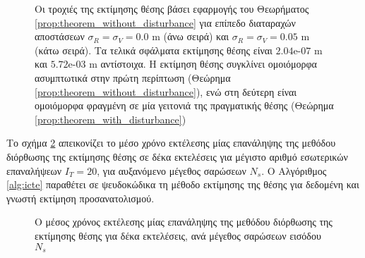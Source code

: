 \begin{figure}[!h]\centering\vspace{1cm}
  
\caption{\small Οι τροχιές της εκτίμησης θέσης βάσει εφαρμογής του Θεωρήματος
         \ref{prop:theorem_without_disturbance} για επίπεδο διαταραχών
         αποστάσεων $\sigma_R = \sigma_V = 0.0$ m (άνω σειρά) και
         $\sigma_R = \sigma_V = 0.05$ m (κάτω σειρά). Τα τελικά σφάλματα
         εκτίμησης θέσης είναι $2.04$e-$07$ m και $5.72$e-$03$ m αντίστοιχα.
         Η εκτίμηση θέσης συγκλίνει ομοιόμορφα ασυμπτωτικά στην πρώτη περίπτωση
         (Θεώρημα \ref{prop:theorem_without_disturbance}), ενώ στη δεύτερη
         είναι ομοιόμορφα φραγμένη σε μία γειτονιά της πραγματικής θέσης
         (Θεώρημα \ref{prop:theorem_with_disturbance})}
\label{fig:02_04_03:map_convergence}
\end{figure}

Το σχήμα \ref{fig:02_04_03:execution_times} απεικονίζει το μέσο χρόνο εκτέλεσης
μίας επανάληψης της μεθόδου διόρθωσης της εκτίμησης θέσης σε δέκα εκτελέσεις
για μέγιστο αριθμό εσωτερικών επαναλήψεων $I_T = 20$, για αυξανόμενο μέγεθος
σαρώσεων $N_s$. Ο Αλγόριθμος \ref{alg:icte} παραθέτει σε ψευδοκώδικα τη μέθοδο
εκτίμησης της θέσης για δεδομένη και γνωστή εκτίμηση προσανατολισμού.

\begin{figure}[!h]\centering
  
\caption{\small Ο μέσος χρόνος εκτέλεσης μίας επανάληψης της μεθόδου διόρθωσης
         της εκτίμησης θέσης για δέκα εκτελέσεις, ανά μέγεθος σαρώσεων εισόδου
         $N_s$}
\label{fig:02_04_03:execution_times}
\end{figure}

